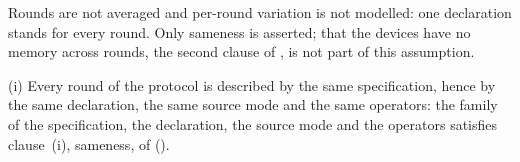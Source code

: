 
Rounds are not averaged and per-round variation is not modelled: one
declaration stands for every round. Only sameness is asserted; that the
devices have no memory across rounds, the second clause of
, is not part of this assumption.

\begin{assumption}\label{ass:rhom}
(i) Every round of the protocol is described by the same specification, hence
by the same declaration, the same source mode and the same operators: the
family of the specification, the declaration, the source mode and the
operators satisfies clause~(i), sameness, of
().
\end{assumption}

